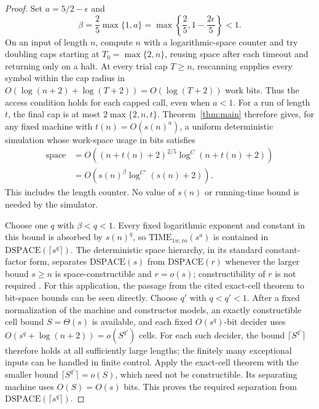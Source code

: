 \begin{proof}
Set \(a=5/2-\epsilon\) and
\[
 \beta=\frac25\max\{1,a\}
       =\max\left\{\frac25,1-\frac{2\epsilon}{5}\right\}<1.
\]
On an input of length \(n\), compute \(n\) with a logarithmic-space
counter and try doubling caps starting at \(T_0=\max\{2,n\}\), reusing
space after each timeout and returning only on a halt. At every trial
cap \(T\ge n\), rescanning supplies every symbol within the cap radius
in \(O(\log(n+2)+\log(T+2))=O(\log(T+2))\) work bits. Thus the access
condition holds for each capped call, even when \(a<1\).
For a run of length \(t\), the final cap is at most
\(2\max\{2,n,t\}\). Theorem~\ref{thm:main} therefore gives, for any
fixed machine with \(t(n)=O(s(n)^a)\), a uniform deterministic simulation
whose work-space usage in bits satisfies
\begin{align*}
 \text{space}
 &=O\!\left((n+t(n)+2)^{2/5}\log^C(n+t(n)+2)\right)\\
 &=O\!\left(s(n)^\beta\log^{C'}(s(n)+2)\right).
\end{align*}
This includes the length counter. No value of \(s(n)\) or running-time
bound is needed by the simulator.

Choose one \(q\) with \(\beta<q<1\). Every fixed logarithmic exponent
and constant in this bound is absorbed by \(s(n)^q\), so
\(\mathrm{TIME}_{1w,\mathrm{ro}}(s^a)\) is contained in
\(\mathrm{DSPACE}(\lceil s^q\rceil)\). The deterministic space hierarchy,
in its standard constant-factor form, separates
\(\mathrm{DSPACE}(s)\) from \(\mathrm{DSPACE}(r)\) whenever the larger
bound \(s\ge n\) is space-constructible and \(r=o(s)\); constructibility
of \(r\) is not required \cite[Theorem~3.1]{LadnerLynch1976}.
For this application, the passage from the cited exact-cell theorem
to bit-space bounds can be seen directly. Choose \(q'\) with
\(q<q'<1\). After a fixed normalization of the machine and constructor
models, an exactly constructible cell bound \(S=\Theta(s)\) is available,
and each fixed \(O(s^q)\)-bit decider uses
\(O(s^q+\log(n+2))=o(S^{q'})\) cells. For each such decider, the bound
\(\lceil S^{q'}\rceil\) therefore holds at all sufficiently large lengths;
the finitely many exceptional inputs can be handled in finite control.
Apply the exact-cell theorem with
the smaller bound \(\lceil S^{q'}\rceil=o(S)\), which need not be
constructible. Its separating machine uses \(O(S)=O(s)\) bits.
This proves the required separation from
\(\mathrm{DSPACE}(\lceil s^q\rceil)\).
\end{proof}

